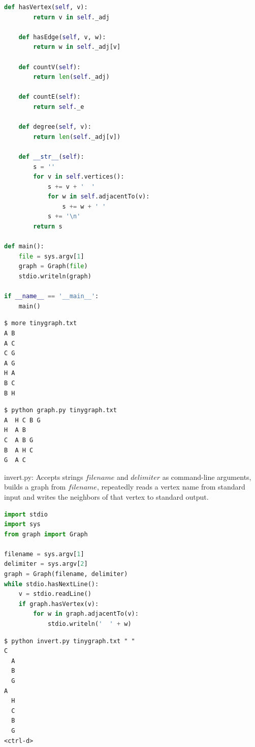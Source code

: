 \documentclass[8pt,a4paper,compress,handout]{beamer}
\begin{document}
\begin{frame}[fragile]
\begin{lstlisting}[language=Python]
    def hasVertex(self, v):
        return v in self._adj

    def hasEdge(self, v, w):
        return w in self._adj[v]
    
    def countV(self):
        return len(self._adj)
    
    def countE(self):
        return self._e
    
    def degree(self, v):
        return len(self._adj[v])

    def __str__(self):
        s = ''
        for v in self.vertices():
            s += v + '  '
            for w in self.adjacentTo(v):
                s += w + ' '
            s += '\n'
        return s

def main():
    file = sys.argv[1]
    graph = Graph(file)
    stdio.writeln(graph)

if __name__ == '__main__':
    main()
\end{lstlisting}
\end{frame}

\begin{frame}[fragile]
\begin{lstlisting}[language={}]
$ more tinygraph.txt
A B
A C
C G
A G
H A
B C
B H
\end{lstlisting}

\begin{lstlisting}[language={}]
$ python graph.py tinygraph.txt 
A  H C B G 
H  A B 
C  A B G 
B  A H C 
G  A C 

\end{lstlisting}
\end{frame}

\begin{frame}[fragile]
\begin{framed}
\tiny invert.py: Accepts strings $filename$ and $delimiter$ as command-line arguments, builds a graph from $filename$, repeatedly reads a vertex name from standard input and writes the neighbors of that vertex to standard output.
\end{framed}

\begin{lstlisting}[language=Python]
import stdio
import sys
from graph import Graph

filename = sys.argv[1]
delimiter = sys.argv[2]
graph = Graph(filename, delimiter)
while stdio.hasNextLine():
    v = stdio.readLine()
    if graph.hasVertex(v):
        for w in graph.adjacentTo(v):
            stdio.writeln('  ' + w)
\end{lstlisting}

\begin{lstlisting}[language={}]
$ python invert.py tinygraph.txt " "
C
  A
  B
  G
A
  H
  C
  B
  G
<ctrl-d>
\end{lstlisting}
\end{frame}
\end{document}
